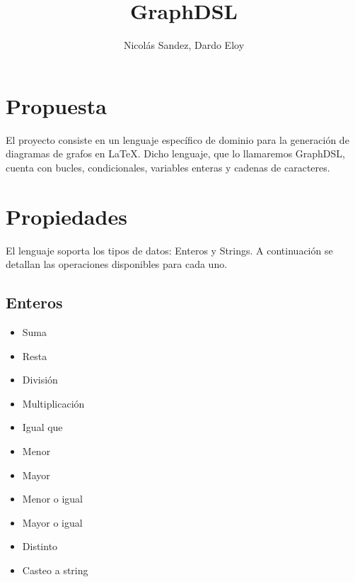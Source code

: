\documentclass{article}
\title{GraphDSL}
\author{Nicolás Sandez, Dardo Eloy}
\begin{document}

    \newcommand{\itb}[1]{\textbf{\textit{#1}}}
    \newcommand{\bd}[1]{\textbf{#1}}
    \newcommand{\curly}{\mathrel{\leadsto}}


    \lstset{language=Python}


	\maketitle
	\newpage
	
	
	\tableofcontents
	\newpage
	
	\section{Propuesta}
	El proyecto consiste en un lenguaje específico de dominio para la generación de diagramas de
grafos en LaTeX. Dicho lenguaje, que lo llamaremos GraphDSL, cuenta con bucles, condicionales, variables enteras y cadenas de caracteres.
	\section{Propiedades}
	El lenguaje soporta los tipos de datos: Enteros y Strings. A continuación se detallan las operaciones disponibles para cada uno.
	\subsection{Enteros}
	\begin{itemize}
		\item Suma
		\item Resta
		\item División
		\item Multiplicación
		\item Igual que
		\item Menor
		\item Mayor
		\item Menor o igual
		\item Mayor o igual
		\item Distinto
		\item Casteo a string
	\end{itemize}
\end{document}
